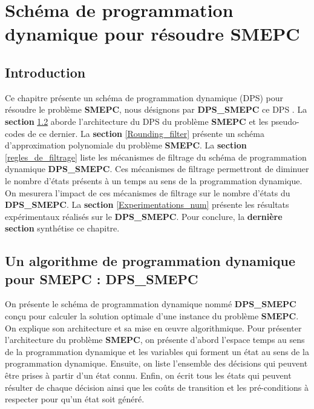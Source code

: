 \chapter{Schéma de programmation dynamique pour résoudre SMEPC}
\minitoc
\newpage
\label{SMEPC_programmation}
\section{Introduction}

Ce chapitre présente un schéma de programmation dynamique (DPS) pour résoudre le problème \textbf{SMEPC}, nous désignons par \textbf{DPS\_SMEPC} ce DPS \cite{ChrMinTot81tsptw}. %
  La \textbf{section} \ref{algo_SMEPC} aborde l'architecture du DPS du problème \textbf{SMEPC} et les pseudo-codes de ce dernier. La \textbf{section} \ref{Rounding_filter} présente un schéma d'approximation polynomiale du problème \textbf{SMEPC}. La \textbf{section} \ref{regles_de_filtrage} liste les mécanismes de filtrage du schéma de programmation dynamique \textbf{DPS\_SMEPC}. Ces mécanismes de filtrage permettront de diminuer le nombre d'états présents à un temps au sens de la programmation dynamique. On mesurera l'impact de ces mécanismes de filtrage sur le nombre d'états du \textbf{DPS\_SMEPC}. La \textbf{section} \ref{Experimentations_num} présente les résultats expérimentaux réalisés sur le \textbf{DPS\_SMEPC}. Pour conclure, la \textbf{dernière section} synthétise ce chapitre.


\section{Un algorithme de programmation dynamique pour SMEPC : DPS\_SMEPC}
\label{algo_SMEPC}
On présente le schéma de programmation dynamique nommé \textbf{DPS\_SMEPC} conçu pour calculer la solution optimale d'une instance du problème \textbf{SMEPC}. On explique son architecture et sa mise en œuvre algorithmique.
Pour présenter l'architecture du problème \textbf{SMEPC}, on présente d'abord l'espace temps au sens de la programmation dynamique et les variables qui forment un état au sens de la programmation dynamique. Ensuite, on liste l'ensemble des décisions qui peuvent être prises à partir d'un état connu. Enfin, on écrit tous les états qui peuvent résulter de chaque décision ainsi que les coûts de transition et les pré-conditions à respecter pour qu'un état soit généré.
